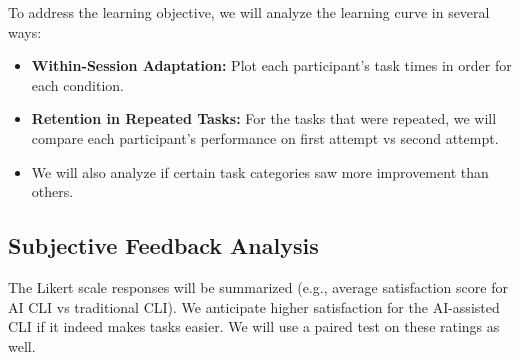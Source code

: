 To address the learning objective, we will analyze the learning curve in several ways:
\begin{itemize}
	\item \textbf{Within-Session Adaptation:} Plot each participant's task times in order for each condition.
	\item \textbf{Retention in Repeated Tasks:} For the tasks that were repeated, we will compare each participant's performance on first attempt vs second attempt.
	\item We will also analyze if certain task categories saw more improvement than others.
\end{itemize}

\subsection{Subjective Feedback Analysis}

The Likert scale responses will be summarized (e.g., average satisfaction score for AI CLI vs traditional CLI). We anticipate higher satisfaction for the AI-assisted CLI if it indeed makes tasks easier. We will use a paired test on these ratings as well.
